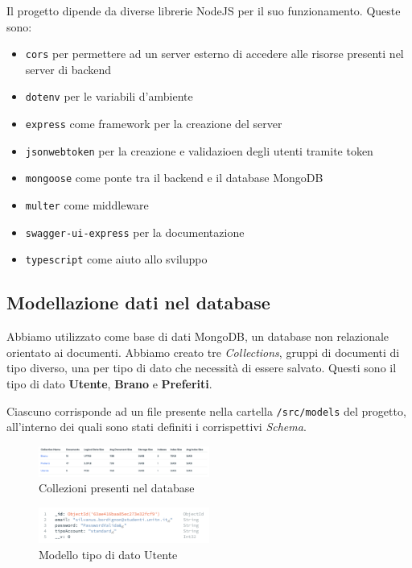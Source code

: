 \documentclass[a4paper,12pt]{article}
\begin{document}
Il progetto dipende da diverse librerie NodeJS per il suo funzionamento. Queste sono:
\begin{itemize}
    \item \texttt{cors} per permettere ad un server esterno di accedere alle risorse presenti nel server di backend
    \item \texttt{dotenv} per le variabili d'ambiente
    \item \texttt{express} come framework per la creazione del server
    \item \texttt{jsonwebtoken} per la creazione e validazioen degli utenti tramite token
    \item \texttt{mongoose} come ponte tra il backend e il database MongoDB
    \item \texttt{multer} come middleware
    \item \texttt{swagger-ui-express} per la documentazione
    \item \texttt{typescript} come aiuto allo sviluppo
\end{itemize}

\subsection{Modellazione dati nel database}

Abbiamo utilizzato come base di dati MongoDB, un database non relazionale orientato ai documenti. Abbiamo creato tre \textit{Collections}, gruppi di documenti di tipo diverso, una per tipo di dato che necessità di essere salvato. Questi sono il tipo di dato \textbf{Utente}, \textbf{Brano} e \textbf{Preferiti}.

Ciascuno corrisponde ad un file presente nella cartella \texttt{/src/models} del progetto, all'interno dei quali sono stati definiti i corrispettivi \textit{Schema}.

\begin{figure}[htp]
    \centering
    \includegraphics[width=0.5\textwidth]{code/collezione-dati.png}
    \caption{Collezioni presenti nel database}
\end{figure}

\begin{figure}[htp]
    \centering
    \includegraphics[width=0.5\textwidth]{code/modello-utente.png}
    \caption{Modello tipo di dato Utente}
\end{figure}
\end{document}
